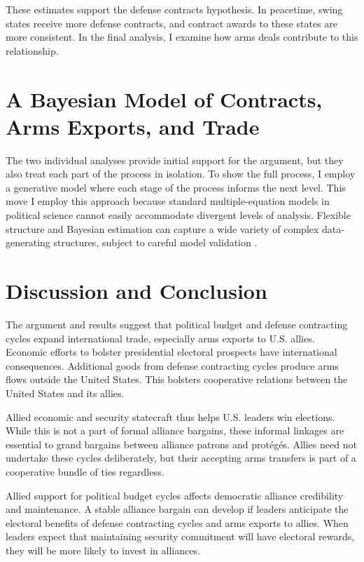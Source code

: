 \documentclass[12pt]{article}
\begin{document}
These estimates support the defense contracts hypothesis. 
In peacetime, swing states receive more defense contracts, and contract awards to these states are more consistent.  
In the final analysis, I examine how arms deals contribute to this relationship.




\section{A Bayesian Model of Contracts, Arms Exports, and Trade}


The two individual analyses provide initial support for the argument, but they also treat each part of the process in isolation. 
To show the full process, I employ a generative model where each stage of the process informs the next level.
This move 
I employ this approach because standard multiple-equation models in political science cannot easily accommodate divergent levels of analysis.
Flexible structure and Bayesian estimation can capture a wide variety of complex data-generating structures, subject to careful model validation \citep{Betancourt2021}. 





\section{Discussion and Conclusion}


The argument and results suggest that political budget and defense contracting cycles expand international trade, especially arms exports to U.S. allies. 
Economic efforts to bolster presidential electoral prospects have international consequences. 
Additional goods from defense contracting cycles produce arms flows outside the United States.
This bolsters cooperative relations between the United States and its allies.


Allied economic and security statecraft thus helps U.S. leaders win elections. 
While this is not a part of formal alliance bargains, these informal linkages are essential to grand bargains between alliance patrons and prot{\'e}g{\'e}s.
Allies need not undertake these cycles deliberately, but their accepting arms transfers is part of a cooperative bundle of ties regardless.


Allied support for political budget cycles affects democratic alliance credibility and maintenance. 
A stable alliance bargain can develop if leaders anticipate the electoral benefits of defense contracting cycles and arms exports to allies.
When leaders expect that maintaining security commitment will have electoral rewards, they will be more likely to invest in alliances. 
\end{document}
